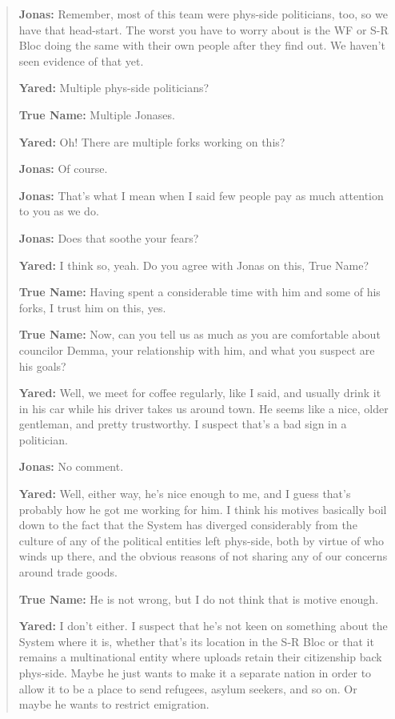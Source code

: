 \begin{quote}
\textbf{Jonas:} Remember, most of this team were phys-side politicians, too, so we have that head-start. The worst you have to worry about is the WF or S-R Bloc doing the same with their own people after they find out. We haven't seen evidence of that yet.

\textbf{Yared:} Multiple phys-side politicians?

\textbf{True Name:} Multiple Jonases.

\textbf{Yared:} Oh! There are multiple forks working on this?

\textbf{Jonas:} Of course.

\textbf{Jonas:} That's what I mean when I said few people pay as much attention to you as we do.

\textbf{Jonas:} Does that soothe your fears?

\textbf{Yared:} I think so, yeah. Do you agree with Jonas on this, True Name?

\textbf{True Name:} Having spent a considerable time with him and some of his forks, I trust him on this, yes.

\textbf{True Name:} Now, can you tell us as much as you are comfortable about councilor Demma, your relationship with him, and what you suspect are his goals?

\textbf{Yared:} Well, we meet for coffee regularly, like I said, and usually drink it in his car while his driver takes us around town. He seems like a nice, older gentleman, and pretty trustworthy. I suspect that's a bad sign in a politician.

\textbf{Jonas:} No comment.

\textbf{Yared:} Well, either way, he's nice enough to me, and I guess that's probably how he got me working for him. I think his motives basically boil down to the fact that the System has diverged considerably from the culture of any of the political entities left phys-side, both by virtue of who winds up there, and the obvious reasons of not sharing any of our concerns around trade goods.

\textbf{True Name:} He is not wrong, but I do not think that is motive enough.

\textbf{Yared:} I don't either. I suspect that he's not keen on something about the System where it is, whether that's its location in the S-R Bloc or that it remains a multinational entity where uploads retain their citizenship back phys-side. Maybe he just wants to make it a separate nation in order to allow it to be a place to send refugees, asylum seekers, and so on. Or maybe he wants to restrict emigration.


\end{quote}
